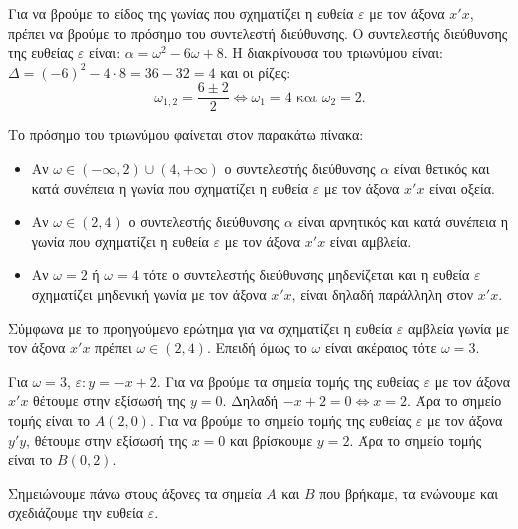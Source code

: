 
\begin{alist}
\item Για να βρούμε το είδος της γωνίας που σχηματίζει η ευθεία $\varepsilon$ με τον άξονα $x'x$, πρέπει να
βρούμε το πρόσημο του συντελεστή διεύθυνσης.
Ο συντελεστής διεύθυνσης της ευθείας $\varepsilon$ είναι: $\alpha = \omega^2 - 6\omega + 8$.
Η διακρίνουσα του τριωνύμου είναι: $\Delta = (-6)^2 - 4 \cdot 8 = 36 - 32 = 4$
και οι ρίζες:
\[\omega_{1,2} = \dfrac{6 \pm 2}{2} \Leftrightarrow \omega_1 = 4 \text{ και } \omega_2 = 2.\]

Το πρόσημο του τριωνύμου φαίνεται στον παρακάτω πίνακα:
\begin{center}
\end{center}

\begin{itemize}
\item Αν $\omega \in (-\infty, 2) \cup (4, +\infty)$ ο συντελεστής διεύθυνσης $\alpha$ είναι θετικός και κατά
συνέπεια η γωνία που σχηματίζει η ευθεία $\varepsilon$ με τον άξονα $x'x$ είναι οξεία.
\item Αν $\omega \in (2, 4)$ ο συντελεστής διεύθυνσης $\alpha$ είναι αρνητικός και κατά συνέπεια η γωνία
που σχηματίζει η ευθεία $\varepsilon$ με τον άξονα $x'x$ είναι αμβλεία.
\item Αν $\omega = 2$ ή $\omega = 4$ τότε ο συντελεστής διεύθυνσης μηδενίζεται και η ευθεία $\varepsilon$
σχηματίζει μηδενική γωνία με τον άξονα $x'x$, είναι δηλαδή παράλληλη στον $x'x$.
\end{itemize}

\item 
\begin{rlist}
\item Σύμφωνα με το προηγούμενο ερώτημα για να σχηματίζει η ευθεία $\varepsilon$ αμβλεία γωνία
με τον άξονα $x'x$ πρέπει $\omega \in (2, 4)$. Επειδή όμως το $\omega$ είναι ακέραιος τότε $\omega = 3$.
\item Για $\omega = 3$, $\varepsilon : y = -x + 2$.
Για να βρούμε τα σημεία τομής της ευθείας $\varepsilon$ με τον άξονα $x'x$ θέτουμε στην εξίσωσή
της $y = 0$. Δηλαδή $-x + 2 = 0 \Leftrightarrow x = 2$. Άρα το σημείο τομής είναι το $A(2, 0)$.
Για να βρούμε το σημείο τομής της ευθείας $\varepsilon$ με τον άξονα $y'y$, θέτουμε στην
εξίσωσή της $x = 0$ και βρίσκουμε $y = 2$. Άρα το σημείο τομής είναι το $B(0, 2)$.
\end{rlist}

\item Σημειώνουμε πάνω στους άξονες τα σημεία $A$ και $B$ που βρήκαμε, τα ενώνουμε και
σχεδιάζουμε την ευθεία $\varepsilon$.
\end{alist}

